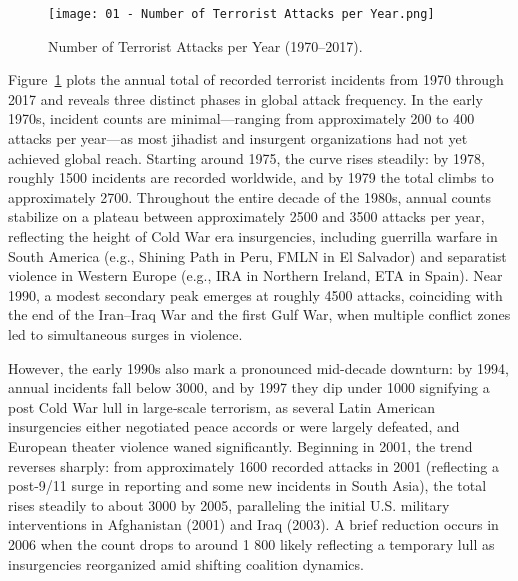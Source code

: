 \begin{figure}[ht]
  \centering
  \texttt{[image: 01 - Number of Terrorist Attacks per Year.png]}
  \caption{Number of Terrorist Attacks per Year (1970–2017).}
  \label{fig:attacks_per_year}
\end{figure}

Figure~\ref{fig:attacks_per_year}  plots the annual total of recorded terrorist incidents from 1970 through 2017 and reveals three distinct phases in global attack frequency. In the early 1970s, incident counts are minimal—ranging from approximately 200 to 400 attacks per year—as most jihadist and insurgent organizations had not yet achieved global reach. Starting around 1975, the curve rises steadily: by 1978, roughly 1500 incidents are recorded worldwide, and by 1979 the total climbs to approximately 2700. Throughout the entire decade of the 1980s, annual counts stabilize on a plateau between approximately 2500 and 3500 attacks per year, reflecting the height of Cold War era insurgencies, including guerrilla warfare in South America (e.g., Shining Path in Peru, FMLN in El Salvador) and separatist violence in Western Europe (e.g., IRA in Northern Ireland, ETA in Spain). Near 1990, a modest secondary peak emerges at roughly 4500 attacks, coinciding with the end of the Iran–Iraq War and the first Gulf War, when multiple conflict zones led to simultaneous surges in violence.

However, the early 1990s also mark a pronounced mid-decade downturn: by 1994, annual incidents fall below 3000, and by 1997 they dip under 1000 signifying a post Cold War lull in large‐scale terrorism, as several Latin American insurgencies either negotiated peace accords or were largely defeated, and European theater violence waned significantly. Beginning in 2001, the trend reverses sharply: from approximately 1600 recorded attacks in 2001 (reflecting a post-9/11 surge in reporting and some new incidents in South Asia), the total rises steadily to about 3000 by 2005, paralleling the initial U.S. military interventions in Afghanistan (2001) and Iraq (2003). A brief reduction occurs in 2006 when the count drops to around 1 800 likely reflecting a temporary lull as insurgencies reorganized amid shifting coalition dynamics.


